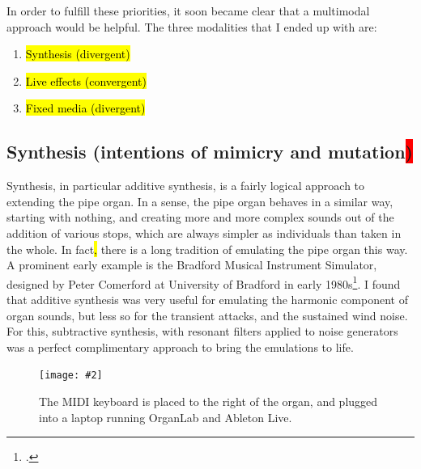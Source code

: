 \documentclass[12pt,twoside,maitrise]{dms_ks}
\newcommand{\customincludegraphics}[4][]{%
    \begin{figure}[H]
        \centering
        \texttt{[image: \#2]}
        \caption{#4}
	\label{#3} 
    \end{figure}
}
\theoremstyle{definition}
\begin{document}
{In order to fulfill these priorities, it soon became clear that a multimodal approach would be helpful. 
The three modalities that I ended up with are:

\begin{enumerate}
  \item \hl{Synthesis (divergent)}
  
  \item \hl{Live effects (convergent)}
  
  \item \hl{Fixed media (divergent)}
\end{enumerate}

\subsection{Synthesis (intentions of mimicry and mutation\colorbox{red}{)}}

Synthesis, in particular additive synthesis, is a fairly logical approach to extending the pipe organ. 
In a sense, the pipe organ behaves in a similar way, starting with nothing, and creating more and more complex sounds out of the addition of various stops, which are always simpler as individuals than taken in the whole. 
In fact\hl{,} there is a long tradition of emulating the pipe organ this way. 
A prominent early example is the Bradford Musical Instrument Simulator, designed by Peter Comerford at University of Bradford in early 1980s\footcite[61]{comerford_simulating_1993}. 
I found that additive synthesis was very useful for emulating the harmonic component of organ sounds, but less so for the transient attacks, and the sustained wind noise. 
For this, subtractive synthesis, with resonant filters applied to noise generators was a perfect complimentary approach to bring the emulations to life.

\customincludegraphics[scale=0.18]{IMG_3414_copy.jpg}{fig:interface}{The MIDI keyboard is placed to the right of the organ, and plugged into a laptop running OrganLab and Ableton Live.}

}
\end{document}
